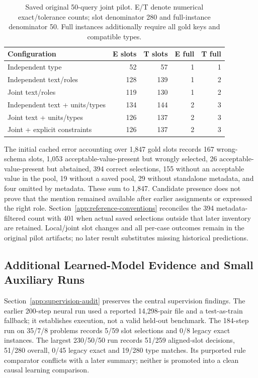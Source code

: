 \begin{table}[htbp]\centering\small
\caption{Saved original 50-query joint pilot. E/T denote numerical exact/tolerance counts; slot denominator 280 and full-instance denominator 50. Full instances additionally require all gold keys and compatible types.}\label{tab:full-joint-pilot}
\begin{tabular}{@{}lrrrr@{}}\toprule
Configuration & E slots & T slots & E full & T full\\\midrule
Independent type &52&57&1&1\\
Independent text/roles &128&139&1&2\\
Joint text/roles &119&130&1&2\\
Independent text + units/types &134&144&2&3\\
Joint text + units/types &126&137&2&3\\
Joint + explicit constraints &126&137&2&3\\
\bottomrule\end{tabular}\end{table}

The initial cached error accounting over 1,847 gold slots records 167 wrong-schema slots, 1,053 acceptable-value-present but wrongly selected, 26 acceptable-value-present but abstained, 394 correct selections, 155 without an acceptable value in the pool, 19 without a saved pool, 29 without standalone metadata, and four omitted by metadata. These sum to 1,847. Candidate presence does not prove that the mention remained available after earlier assignments or expressed the right role. Section~\ref{app:reference-conventions} reconciles the 394 metadata-filtered count with 401 when actual saved selections outside that later inventory are retained. Local/joint slot changes and all per-case outcomes remain in the original pilot artifacts; no later result substitutes missing historical predictions.

\subsection{Additional Learned-Model Evidence and Small Auxiliary Runs}
Section~\ref{app:supervision-audit} preserves the central supervision findings. The earlier 200-step neural run used a reported 14,298-pair file and a test-as-train fallback; it establishes execution, not a valid held-out benchmark. The 184-step run on 35/7/8 problems records 5/59 slot selections and 0/8 legacy exact instances. The largest 230/50/50 run records 51/259 aligned-slot decisions, 51/280 overall, 0/45 legacy exact and 19/280 type matches. Its purported rule comparator conflicts with a later summary; neither is promoted into a clean causal learning comparison.


